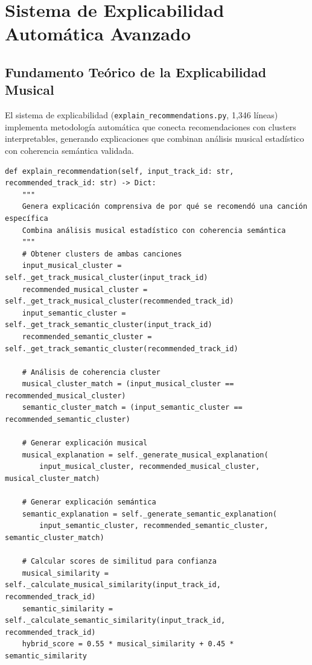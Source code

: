\documentclass[12pt,a4paper]{report}
\begin{document}
\section{Sistema de Explicabilidad Automática Avanzado}

\subsection{Fundamento Teórico de la Explicabilidad Musical}

El sistema de explicabilidad (\texttt{explain\_recommendations.py}, 1,346 líneas) implementa metodología automática que conecta recomendaciones con clusters interpretables, generando explicaciones que combinan análisis musical estadístico con coherencia semántica validada.

\begin{lstlisting}[caption={Generación Automática de Explicaciones Comprensivas}]
def explain_recommendation(self, input_track_id: str, recommended_track_id: str) -> Dict:
    """
    Genera explicación comprensiva de por qué se recomendó una canción específica
    Combina análisis musical estadístico con coherencia semántica
    """
    # Obtener clusters de ambas canciones
    input_musical_cluster = self._get_track_musical_cluster(input_track_id)
    recommended_musical_cluster = self._get_track_musical_cluster(recommended_track_id)
    input_semantic_cluster = self._get_track_semantic_cluster(input_track_id)
    recommended_semantic_cluster = self._get_track_semantic_cluster(recommended_track_id)

    # Análisis de coherencia cluster
    musical_cluster_match = (input_musical_cluster == recommended_musical_cluster)
    semantic_cluster_match = (input_semantic_cluster == recommended_semantic_cluster)

    # Generar explicación musical
    musical_explanation = self._generate_musical_explanation(
        input_musical_cluster, recommended_musical_cluster, musical_cluster_match)

    # Generar explicación semántica
    semantic_explanation = self._generate_semantic_explanation(
        input_semantic_cluster, recommended_semantic_cluster, semantic_cluster_match)

    # Calcular scores de similitud para confianza
    musical_similarity = self._calculate_musical_similarity(input_track_id, recommended_track_id)
    semantic_similarity = self._calculate_semantic_similarity(input_track_id, recommended_track_id)
    hybrid_score = 0.55 * musical_similarity + 0.45 * semantic_similarity


\end{lstlisting}
\end{document}
